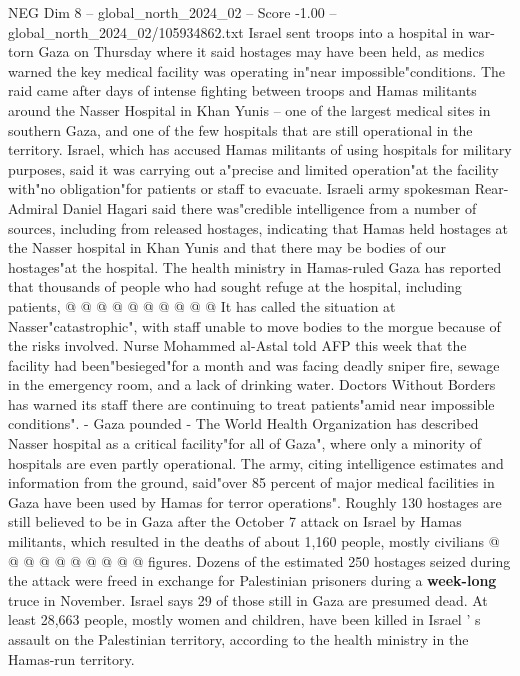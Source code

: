 \begin{textsample}{NEG Dim 8 – global\_north\_2024\_02 – Score -1.00 – global\_north\_2024\_02/105934862.txt}  \label{ex:f8_neg_235}
Israel sent troops into a hospital in war-torn Gaza on Thursday where it said hostages may have been held, as medics warned the key medical facility was operating in"near impossible"conditions.
The raid came after days of intense fighting between troops and Hamas militants around the Nasser Hospital in Khan Yunis -- one of the largest medical sites in southern Gaza, and one of the few hospitals that are still operational in the territory.
Israel, which has accused Hamas militants of using hospitals for military purposes, said it was carrying out a"precise and limited operation"at the facility with"no obligation"for patients or staff to evacuate.
Israeli army spokesman Rear-Admiral Daniel Hagari said there was"credible intelligence from a number of sources, including from released hostages, indicating that Hamas held hostages at the Nasser hospital in Khan Yunis and that there may be bodies of our hostages"at the hospital.
The health ministry in Hamas-ruled Gaza has reported that thousands of people who had sought refuge at the hospital, including patients, @ @ @ @ @ @ @ @ @ @ It has called the situation at Nasser"catastrophic", with staff unable to move bodies to the morgue because of the risks involved.
Nurse Mohammed al-Astal told AFP this week that the facility had been"besieged"for a month and was facing deadly sniper fire, sewage in the emergency room, and a lack of drinking water.
Doctors Without Borders has warned its staff there are continuing to treat patients"amid near impossible conditions". - Gaza pounded - The World Health Organization has described Nasser hospital as a critical facility"for all of Gaza", where only a minority of hospitals are even partly operational.
The army, citing intelligence estimates and information from the ground, said"over 85 percent of major medical facilities in Gaza have been used by Hamas for terror operations".
Roughly 130 hostages are still believed to be in Gaza after the October 7 attack on Israel by Hamas militants, which resulted in the deaths of about 1,160 people, mostly civilians @ @ @ @ @ @ @ @ @ @ figures.
Dozens of the estimated 250 hostages seized during the attack were freed in exchange for Palestinian prisoners during a \textbf{week-long} truce in November.
Israel says 29 of those still in Gaza are presumed dead.
At least 28,663 people, mostly women and children, have been killed in Israel ' s assault on the Palestinian territory, according to the health ministry in the Hamas-run territory.

\end{textsample}
